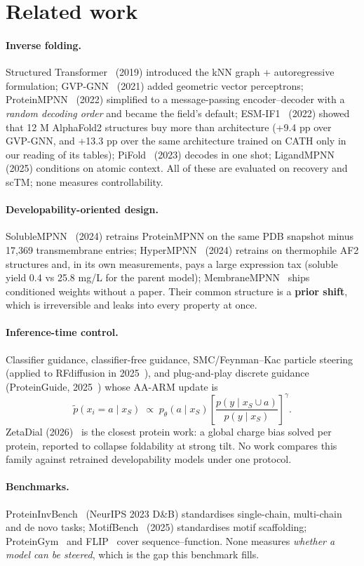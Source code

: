 \section{Related work}
\label{sec:related}

\paragraph{Inverse folding.}
Structured Transformer~\cite{struc_transformer} (2019) introduced the kNN graph
+ autoregressive formulation; GVP-GNN~\cite{gvp} (2021) added geometric vector
perceptrons; ProteinMPNN~\cite{proteinmpnn} (2022) simplified to a
message-passing encoder--decoder with a \emph{random decoding order} and became
the field's default; ESM-IF1~\cite{esm_if1} (2022) showed that 12 M AlphaFold2
structures buy more than architecture (+9.4 pp over GVP-GNN, and +13.3 pp over
the same architecture trained on CATH only in our reading of its tables);
PiFold~\cite{pifold} (2023)
decodes in one shot; LigandMPNN~\cite{ligandmpnn} (2025) conditions on atomic
context. All of these are evaluated on recovery and scTM; none measures
controllability.

\paragraph{Developability-oriented design.}
SolubleMPNN~\cite{soluble_mpnn} (2024) retrains ProteinMPNN on the same PDB
snapshot minus 17,369 transmembrane entries; HyperMPNN~\cite{hypermpnn} (2024)
retrains on thermophile AF2 structures and, in its own measurements, pays a
large expression tax (soluble yield 0.4 vs 25.8 mg/L for the parent model);
MembraneMPNN~\cite{membranempnn} ships conditioned weights
without a paper. Their common structure is a \textbf{prior shift}, which is
irreversible and leaks into every property at once.

\paragraph{Inference-time control.}
Classifier guidance, classifier-free guidance, SMC/Feynman--Kac particle
steering (applied to RFdiffusion in 2025~\cite{fk_rfdiffusion}), and
plug-and-play discrete guidance (ProteinGuide,
2025~\cite{discrete_guidance,proteinguide}) whose AA-ARM update is
\[
  \tilde{p}(x_i{=}a \mid x_S) \;\propto\;
  p_\theta(a \mid x_S)
  \left[
    \frac{p(y \mid x_S \cup a)}{p(y \mid x_S)}
  \right]^{\gamma}.
\]
ZetaDial (2026)~\cite{zetadial} is the closest protein work: a global charge
bias solved per protein, reported to collapse foldability at strong tilt. No
work compares this family against retrained developability models under one
protocol.

\paragraph{Benchmarks.}
ProteinInvBench~\cite{proteininvbench} (NeurIPS 2023 D\&B) standardises
single-chain, multi-chain and de novo tasks; MotifBench~\cite{motifbench} (2025)
standardises motif scaffolding; ProteinGym~\cite{proteingym} and
FLIP~\cite{flip} cover sequence--function. None measures \emph{whether a model
can be steered}, which is the gap this benchmark fills.
